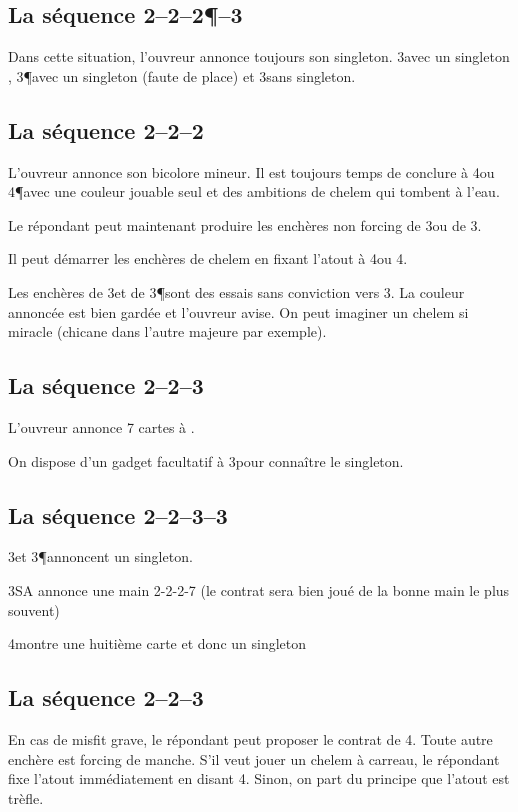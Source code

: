 \begin{multicols}{2}
  \subsection*{La séquence 2\T--2\K--2\P--3\K}

  Dans cette situation, l'ouvreur annonce toujours son singleton. 3\C avec un singleton \C, 3\P avec un singleton \K (faute de place) et 3\NT sans singleton.

\subsection*{La séquence 2\T--2\K--2\NT}

 L'ouvreur annonce son bicolore mineur. Il est toujours temps de conclure à 4\C ou 4\P avec une couleur jouable seul et des ambitions de chelem qui tombent à l'eau.

 Le répondant peut maintenant produire les enchères non forcing de 3\T ou de 3\K.

 Il peut démarrer les enchères de chelem en fixant l'atout à 4\T ou 4\K.

 Les enchères de 3\C et de 3\P sont des essais sans conviction vers 3\NT. La couleur annoncée est bien gardée et l'ouvreur avise. On peut imaginer un chelem si miracle (chicane dans l'autre majeure par exemple).

 \subsection*{La séquence 2\T--2\K--3\T}

 L'ouvreur annonce 7 cartes à \T.

 On dispose d'un gadget facultatif à 3\K pour connaître le singleton.

 \subsection*{La séquence 2\T--2\K--3\T--3\K}

 3\C et 3\P annoncent un singleton.

 3SA annonce une main 2-2-2-7 (le contrat sera bien joué de la bonne main le plus souvent)

 4\T montre une huitième carte et donc un singleton \K

 \subsection*{La séquence 2\T--2\K--3\K}

 En cas de misfit grave, le répondant peut proposer le contrat de 4\T. Toute autre enchère est forcing de manche. S'il veut jouer un chelem à carreau, le répondant fixe l'atout immédiatement en disant 4\K. Sinon, on part du principe que l'atout est trèfle.

\end{multicols}


